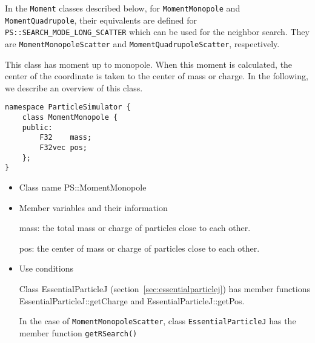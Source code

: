\label{sec:MomentForSearchModeLong}
In the \texttt{Moment} classes described below,
for \texttt{MomentMonopole} and \texttt{MomentQuadrupole},
their equivalents are defined for
\texttt{PS::SEARCH\_MODE\_LONG\_SCATTER} which can be used for the
neighbor search. They are \texttt{MomentMonopoleScatter}
and \texttt{MomentQuadrupoleScatter}, respectively.




This class has moment up to monopole. When this moment is calculated,
the center of the coordinate is taken to the center of mass or
charge. In the following, we describe an overview of this class.
\begin{screen}
\begin{verbatim}
namespace ParticleSimulator {
    class MomentMonopole {
    public:
        F32    mass;
        F32vec pos;
    };
}
\end{verbatim}
\end{screen}

\begin{itemize}
\item Class name
  PS::MomentMonopole

\item Member variables and their information

  mass: the total mass or charge of particles close to each other.

  pos: the center of mass or charge of particles close to each other.

\item Use conditions

  Class EssentialParticleJ (section~\ref{sec:essentialparticlej}) has
  member functions EssentialParticleJ::getCharge and
  EssentialParticleJ::getPos.

  In the case of \texttt{MomentMonopoleScatter},
  class \texttt{EssentialParticleJ} has the member function
  \texttt{getRSearch()}

\end{itemize}



